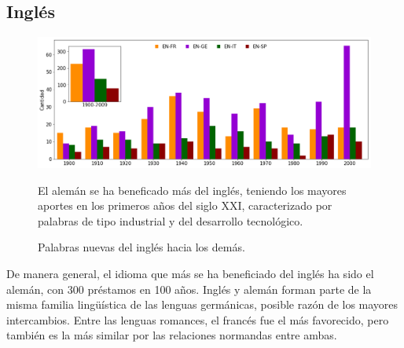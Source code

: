 \subsection{Inglés}

\begin{figure}[h!]
	\centering
	\includegraphics[scale=.38]{Cap_3/NC_EN.png}
	\label{fig.NC_EN}
	\caption{Palabras nuevas del inglés hacia los demás.}
	\smallskip
	\small
	El alemán se ha beneficado más del inglés, teniendo los mayores aportes en los primeros años del siglo XXI, caracterizado por palabras de tipo industrial y del desarrollo tecnológico.
\end{figure}



	
	
	

De manera general, el idioma que más se ha beneficiado del inglés ha sido el
alemán, con 300 préstamos en 100 años.  Inglés y alemán forman parte de la
misma familia lingüística de las lenguas germánicas,  posible razón de los
mayores intercambios. Entre las lenguas romances, el francés fue el más
favorecido, pero también es la más similar por las relaciones normandas entre
ambas.
